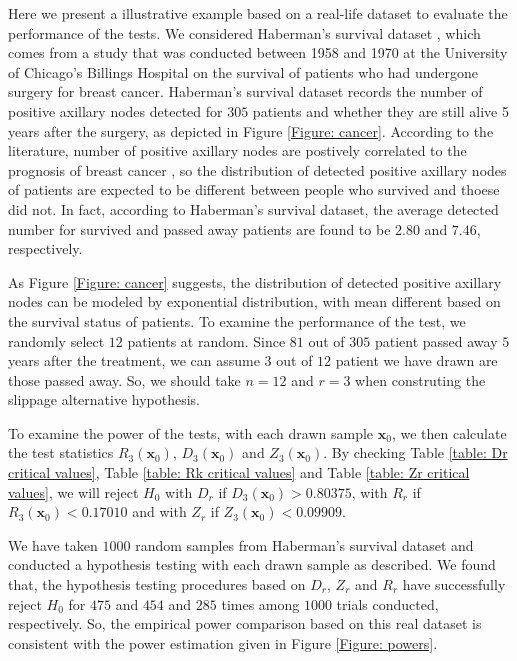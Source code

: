 \documentclass{report}
\begin{document}
Here we present a illustrative example based on a real-life dataset to evaluate the performance of the tests. We considered Haberman's survival dataset \cite{lim1999haberman},
which comes from a study that was conducted between 1958 and 1970 at the University of Chicago's Billings Hospital on the survival of patients who had undergone surgery for breast cancer.
Haberman's survival dataset records the number of positive axillary nodes detected for $305$ patients and whether they are still alive 5 years after the surgery, as depicted in Figure \ref{Figure: cancer}.
According to the literature, number of positive axillary nodes are postively correlated to the prognosis of breast cancer \cite{fisher1983relation}, so the distribution of
detected positive axillary nodes of patients are expected to be different between people who survived and thoese did not.
In fact, according to Haberman's survival dataset, the average detected number for survived and passed away patients are found to be $2.80$ and $7.46$, respectively. 

As Figure \ref{Figure: cancer} suggests, the distribution of detected positive axillary nodes
can be modeled by exponential distribution, with mean different based on the survival status of patients. To examine the performance of the test,
we randomly select $12$ patients at random. Since $81$ out of $305$ patient passed away $5$ years after the treatment, we can assume $3$ out of $12$ patient we have drawn are those passed away. 
So, we should take $n = 12$ and $r =3$ when construting the slippage alternative hypothesis.

To examine the power of the tests, with each drawn sample $\mathbf x_0$, we then calculate the test statistics $R_{3}(\mathbf x_0)$, $D_{3}(\mathbf x_0)$ and $Z_{3}(\mathbf x_0)$.
By checking Table \ref{table: Dr critical values}, Table \ref{table: Rk critical values} and Table \ref{table: Zr critical values}, we will reject $H_0$
with $D_r$ if $D_{3}(\mathbf x_0) > 0.80375$, with $R_r$ if  $R_{3}(\mathbf x_0) < 0.17010$ and with $Z_r$ if $Z_3(\mathbf x_0) < 0.09909$.

We have taken $1000$ random samples from Haberman's survival dataset and conducted a hypothesis testing with each drawn sample as described. We found that, the hypothesis testing
procedures based on $D_r$, $Z_r$ and $R_r$ have successfully reject $H_0$ for $475$ and $454$ and $285$ times among $1000$ trials conducted, respectively.
So, the empirical power comparison based on this real dataset is consistent with the power estimation given in Figure \ref{Figure: powers}.
\end{document}
